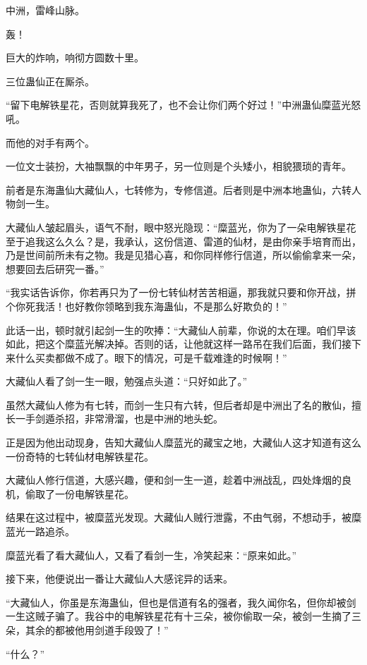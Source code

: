 
\begin{this_body}

中洲，雷峰山脉。

轰！

巨大的炸响，响彻方圆数十里。

三位蛊仙正在厮杀。

“留下电解铁星花，否则就算我死了，也不会让你们两个好过！”中洲蛊仙糜蓝光怒吼。

而他的对手有两个。

一位文士装扮，大袖飘飘的中年男子，另一位则是个头矮小，相貌猥琐的青年。

前者是东海蛊仙大藏仙人，七转修为，专修信道。后者则是中洲本地蛊仙，六转人物剑一生。

大藏仙人皱起眉头，语气不耐，眼中怒光隐现：“糜蓝光，你为了一朵电解铁星花至于追我这么久么？是，我承认，这份信道、雷道的仙材，是由你亲手培育而出，乃是世间前所未有之物。我是见猎心喜，和你同样修行信道，所以偷偷拿来一朵，想要回去后研究一番。”

“我实话告诉你，你若再只为了一份七转仙材苦苦相逼，那我就只要和你开战，拼个你死我活！也好教你领略到我东海蛊仙，不是那么好欺负的！”

此话一出，顿时就引起剑一生的吹捧：“大藏仙人前辈，你说的太在理。咱们早该如此，把这个糜蓝光解决掉。否则的话，让他就这样一路吊在我们后面，我们接下来什么买卖都做不成了。眼下的情况，可是千载难逢的时候啊！”

大藏仙人看了剑一生一眼，勉强点头道：“只好如此了。”

虽然大藏仙人修为有七转，而剑一生只有六转，但后者却是中洲出了名的散仙，擅长一手剑遁杀招，非常滑溜，也是中洲的地头蛇。

正是因为他出动现身，告知大藏仙人糜蓝光的藏宝之地，大藏仙人这才知道有这么一份奇特的七转仙材电解铁星花。

大藏仙人修行信道，大感兴趣，便和剑一生一道，趁着中洲战乱，四处烽烟的良机，偷取了一份电解铁星花。

结果在这过程中，被糜蓝光发现。大藏仙人贼行泄露，不由气弱，不想动手，被糜蓝光一路追杀。

糜蓝光看了看大藏仙人，又看了看剑一生，冷笑起来：“原来如此。”

接下来，他便说出一番让大藏仙人大感诧异的话来。

“大藏仙人，你虽是东海蛊仙，但也是信道有名的强者，我久闻你名，但你却被剑一生这贼子骗了。我谷中的电解铁星花有十三朵，被你偷取一朵，被剑一生摘了三朵，其余的都被他用剑道手段毁了！”

“什么？”


\end{this_body}
